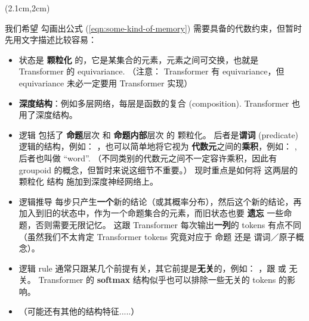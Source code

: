 \begin{preview}
\begin{minipage}{\textwidth}
	
\setlength{\parskip}{0.4\baselineskip}
\begin{textblock*}{20cm}(2.1cm,2cm) %
	{}
	\hspace{8cm}
\end{textblock*}
\vspace*{0.3cm} 

我们希望 勾画出公式 (\ref{eqn:some-kind-of-memory}) 需要具备的代数约束，但暂时先用文字描述比较容易：

\begin{itemize}
	\item 状态是 \textbf{颗粒化} 的，它是某集合的元素，元素之间可交换，也就是 Transformer 的 equivariance. （注意： Transformer 有 equivariance，但 equivariance 未必一定要用 Transformer 实现）

	\item \textbf{深度结构}：例如多层网络，每层是函数的复合 (composition). Transformer 也用了深度结构。
	
	\item 逻辑 包括了 \textbf{命题}层次 和 \textbf{命题内部}层次 的 颗粒化。 后者是\textbf{谓词} (predicate) 逻辑的结构，例如： ，也可以简单地将它视为 \textbf{代数元}之间的\textbf{乘积}，例如： , 后者也叫做 ``word''.  （不同类别的代数元之间不一定容许乘积，因此有 groupoid 的概念，但暂时来说这细节不重要。） 现时重点是如何将 这两层的 颗粒化 结构 施加到深度神经网络上。 

	\item 逻辑推导 每步只产生\textbf{一个}新的结论（或其概率分布），然后这个新的结论，再加入到旧的状态中，作为一个命题集合的元素，而旧状态也要 \textbf{遗忘} 一些命题，否则需要无限记忆。 这跟 Transformer 每次输出\textbf{一列}的 tokens 有点不同（虽然我们不太肯定 Transformer tokens 究竟对应于 命题 还是 谓词／原子概念）。 
	
	\item 逻辑 rule 通常只跟某几个前提有关，其它前提是\textbf{无关}的，例如： ，跟  或  无关。 Transformer 的 \textbf{softmax} 结构似乎也可以排除一些无关的 tokens 的影响。

	\item （可能还有其他的结构特征.....）
\end{itemize}


\end{minipage}
\end{preview}

